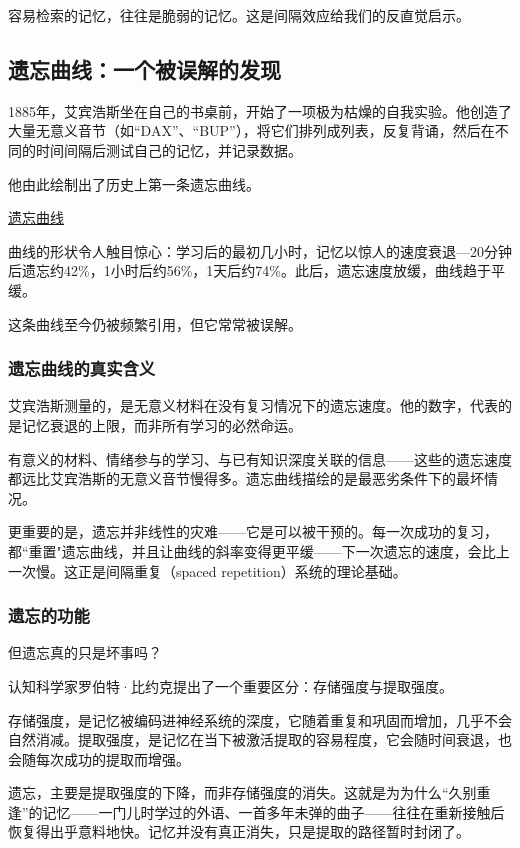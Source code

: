 \documentclass[11pt]{article}
\begin{document}
容易检索的记忆，往往是脆弱的记忆。这是间隔效应给我们的反直觉启示。
\subsection{遗忘曲线：一个被误解的发现}
\label{sec:org3e9c478}

1885年，艾宾浩斯坐在自己的书桌前，开始了一项极为枯燥的自我实验。他创造了大量无意义音节（如“DAX”、“BUP”），将它们排列成列表，反复背诵，然后在不同的时间间隔后测试自己的记忆，并记录数据。

他由此绘制出了历史上第一条遗忘曲线。

\href{file:///c:/Users/fupen/org/book/插图/遗忘曲线.png}{遗忘曲线}

曲线的形状令人触目惊心：学习后的最初几小时，记忆以惊人的速度衰退—20分钟后遗忘约42\%，1小时后约56\%，1天后约74\%。此后，遗忘速度放缓，曲线趋于平缓。

这条曲线至今仍被频繁引用，但它常常被误解。
\subsubsection{遗忘曲线的真实含义}
\label{sec:orga771d5c}

艾宾浩斯测量的，是无意义材料在没有复习情况下的遗忘速度。他的数字，代表的是记忆衰退的上限，而非所有学习的必然命运。

有意义的材料、情绪参与的学习、与已有知识深度关联的信息——这些的遗忘速度都远比艾宾浩斯的无意义音节慢得多。遗忘曲线描绘的是最恶劣条件下的最坏情况。

更重要的是，遗忘并非线性的灾难——它是可以被干预的。每一次成功的复习，都“重置"遗忘曲线，并且让曲线的斜率变得更平缓——下一次遗忘的速度，会比上一次慢。这正是间隔重复（spaced repetition）系统的理论基础。
\subsubsection{遗忘的功能}
\label{sec:orge3f551e}

但遗忘真的只是坏事吗？

认知科学家罗伯特·比约克提出了一个重要区分：存储强度与提取强度。

存储强度，是记忆被编码进神经系统的深度，它随着重复和巩固而增加，几乎不会自然消减。提取强度，是记忆在当下被激活提取的容易程度，它会随时间衰退，也会随每次成功的提取而增强。

遗忘，主要是提取强度的下降，而非存储强度的消失。这就是为为什么“久别重逢”的记忆——一门儿时学过的外语、一首多年未弹的曲子——往往在重新接触后恢复得出乎意料地快。记忆并没有真正消失，只是提取的路径暂时封闭了。
\end{document}
